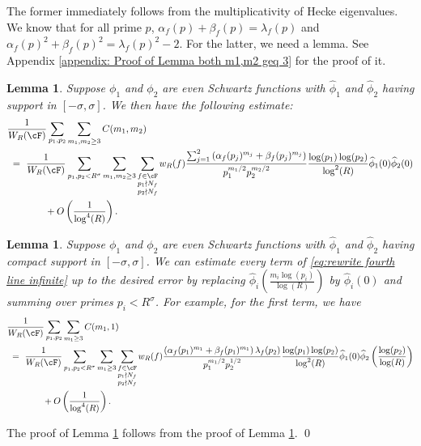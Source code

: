 \documentclass[11pt, reqno]{amsart}
\newtheorem{lemma}[theorem]{Lemma}
\theoremstyle{definition}
\theoremstyle{remark}
\numberwithin{equation}{section}
\renewcommand{\hat}{\widehat}
\begin{document}
The former immediately follows from the multiplicativity of Hecke eigenvalues. We know that for all prime $p$, $\alpha_f(p) + \beta_f(p) = \lambda_f(p)$ and $\alpha_f(p)^2 + \beta_f(p)^2 = \lambda_f(p)^2-2$. For the latter, we need a lemma. See Appendix \ref{appendix: Proof of Lemma both m1,m2 geq 3} for the proof of it.
\begin{lemma}\label{lemma1: both m_1,m_2 geq 3} Suppose $\phi_1$ and $\phi_2$ are even Schwartz functions with $\hat\phi_1$ and $\hat\phi_2$ having support in $[-\sigma,\sigma]$.
We then have the following estimate: 
\small{\begin{align}\label{lem:phi0.estimate.statment}
    &\frac{1}{W_R(\cF)}\sum_{\substack{p_1,p_2}}\sum_{m_1,m_2\geq 3} C(m_1,m_2)\notag \\
    & \ = \ \frac{1}{W_R(\cF)}\sum_{p_1,p_2<R^\sigma}\sum_{m_1,m_2\geq 3}\sum_{\substack{f\in \cF\\p_1\nmid N_f\\p_2\nmid N_f }}w_R(f)\frac{\sum_{j=1}^2\left(\alpha_f(p_j)^{m_j}+\beta_f(p_j)^{m_j}\right)}{p_1^{m_1/2}p_2^{m_2/2}} \frac{\log(p_1)\log (p_2)}{\log^2(R)}\hat\phi_1(0) \hat \phi_2(0) \notag \\
    & \qquad\qquad + O\left(\frac{1}{\log^4(R)}\right).
\end{align}}
\end{lemma}\normalsize
\begin{lemma}\label{lemma 5.4.2: only one m_i geq 3}
Suppose $\phi_1$ and $\phi_2$ are even Schwartz functions with $\hat\phi_1$ and $\hat\phi_2$ having compact support in $[-\sigma,\sigma]$.
We can estimate every term of \eqref{eq:rewrite fourth line infinite} up to the desired error by replacing $\hat\phi_i\left(\frac{m_i\log(p_i)}{\log(R)}\right)$ by $\hat\phi_i(0)$ and summing over primes $p_i < R^\sigma$. For example, for the first term, we have 
\small\begin{align}
   &\frac{1}{W_R(\cF)}\sum_{\substack{p_1,p_2}}\sum_{m_1\geq 3} C(m_1,1)\notag \\ & \ = \  \frac{1}{W_R(\cF)}\sum_{p_1,p_2<R^\sigma}\sum_{m_1\geq 3}\sum_{\substack{f\in \cF\\p_1\nmid N_f\\p_2\nmid N_f }}w_R(f)\frac{\left(\alpha_f(p_1)^{m_1}+\beta_f(p_1)^{m_1}\right)\lambda_f(p_2)}{p_1^{m_1/2}p_2^{1/2}} \frac{\log(p_1)\log (p_2)}{\log^2(R)}\hat\phi_1(0) \hat \phi_2\left(\frac{\log(p_2)}{\log(R)}\right) \notag \\
    & \qquad\qquad + O\left(\frac{1}{\log^4(R)}\right).
\end{align}\normalsize
\end{lemma}
The proof of Lemma \ref{lemma 5.4.2: only one m_i geq 3} follows from the proof of Lemma \ref{lemma1: both m_1,m_2 geq 3}. \qed
\end{document}
